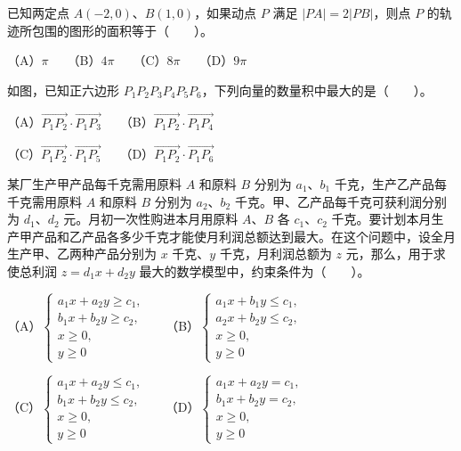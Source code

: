 \begin{question}
已知两定点 $A(-2,0)$、$B(1,0)$，如果动点 $P$ 满足 $|PA|=2|PB|$，则点 $P$ 的轨迹所包围的图形的面积等于\mbox{（　　）}。

（A）$\pi$　　（B）$4\pi$　　（C）$8\pi$　　（D）$9\pi$

\Needspace{0.4\textheight}
\end{question}
\begin{question}
如图，已知正六边形 $P_1P_2P_3P_4P_5P_6$，下列向量的数量积中最大的是\mbox{（　　）}。
\nopagebreak[4]
\begin{center}\end{center}
\nopagebreak[4]
（A）$\overrightarrow{P_1P_2}\cdot\overrightarrow{P_1P_3}$　　（B）$\overrightarrow{P_1P_2}\cdot\overrightarrow{P_1P_4}$

（C）$\overrightarrow{P_1P_2}\cdot\overrightarrow{P_1P_5}$　　（D）$\overrightarrow{P_1P_2}\cdot\overrightarrow{P_1P_6}$

\end{question}
\begin{question}
某厂生产甲产品每千克需用原料 $A$ 和原料 $B$ 分别为 $a_1\text{、}b_1$ 千克，生产乙产品每千克需用原料 $A$ 和原料 $B$ 分别为 $a_2\text{、}b_2$ 千克。甲、乙产品每千克可获利润分别为 $d_1\text{、}d_2$ 元。月初一次性购进本月用原料 $A\text{、}B$ 各 $c_1\text{、}c_2$ 千克。要计划本月生产甲产品和乙产品各多少千克才能使月利润总额达到最大。在这个问题中，设全月生产甲、乙两种产品分别为 $x$ 千克、$y$ 千克，月利润总额为 $z$ 元，那么，用于求使总利润 $z=d_1x+d_2y$ 最大的数学模型中，约束条件为\mbox{（　　）}。

（A）$\begin{cases}a_1x+a_2y\geqslant c_1,\\b_1x+b_2y\geqslant c_2,\\x\geqslant0,\\y\geqslant0\end{cases}$　　（B）$\begin{cases}a_1x+b_1y\leqslant c_1,\\a_2x+b_2y\leqslant c_2,\\x\geqslant0,\\y\geqslant0\end{cases}$

（C）$\begin{cases}a_1x+a_2y\leqslant c_1,\\b_1x+b_2y\leqslant c_2,\\x\geqslant0,\\y\geqslant0\end{cases}$　　（D）$\begin{cases}a_1x+a_2y=c_1,\\b_1x+b_2y=c_2,\\x\geqslant0,\\y\geqslant0\end{cases}$

\end{question}
